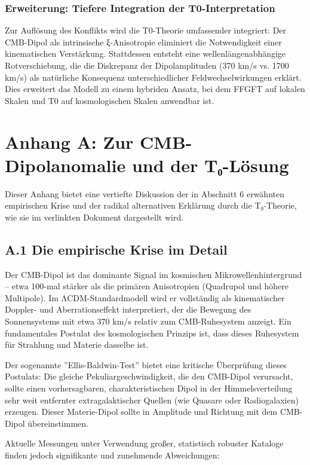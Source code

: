 \subsubsection*{Erweiterung: Tiefere Integration der T0-Interpretation}
Zur Auflösung des Konflikts wird die T0-Theorie umfassender integriert: Der CMB-Dipol als intrinsische ξ-Anisotropie eliminiert die Notwendigkeit einer kinematischen Verstärkung. Stattdessen entsteht eine wellenlängenabhängige Rotverschiebung, die die Diskrepanz der Dipolamplituden (370 km/s vs. 1700 km/s) als natürliche Konsequenz unterschiedlicher Feldwechselwirkungen erklärt. Dies erweitert das Modell zu einem hybriden Ansatz, bei dem FFGFT auf lokalen Skalen und T0 auf kosmologischen Skalen anwendbar ist.

\section*{Anhang A: Zur CMB-Dipolanomalie und der T₀-Lösung}

Dieser Anhang bietet eine vertiefte Diskussion der in Abschnitt 6 erwähnten empirischen Krise und der radikal alternativen Erklärung durch die T₀-Theorie, wie sie im verlinkten Dokument dargestellt wird.

\subsection*{A.1 Die empirische Krise im Detail}

Der CMB-Dipol ist das dominante Signal im kosmischen Mikrowellenhintergrund – etwa 100-mal stärker als die primären Anisotropien (Quadrupol und höhere Multipole). Im ΛCDM-Standardmodell wird er vollständig als kinematischer Doppler- und Aberrationseffekt interpretiert, der die Bewegung des Sonnensystems mit etwa 370 km/s relativ zum CMB-Ruhesystem anzeigt. Ein fundamentales Postulat des kosmologischen Prinzips ist, dass dieses Ruhesystem für Strahlung und Materie dasselbe ist.

Der sogenannte ''Ellis-Baldwin-Test'' bietet eine kritische Überprüfung dieses Postulats: Die gleiche Pekuliargeschwindigkeit, die den CMB-Dipol verursacht, sollte einen vorhersagbaren, charakteristischen Dipol in der Himmelsverteilung sehr weit entfernter extragalaktischer Quellen (wie Quasare oder Radiogalaxien) erzeugen. Dieser Materie-Dipol sollte in Amplitude und Richtung mit dem CMB-Dipol übereinstimmen.

Aktuelle Messungen unter Verwendung großer, statistisch robuster Kataloge finden jedoch signifikante und zunehmende Abweichungen:

